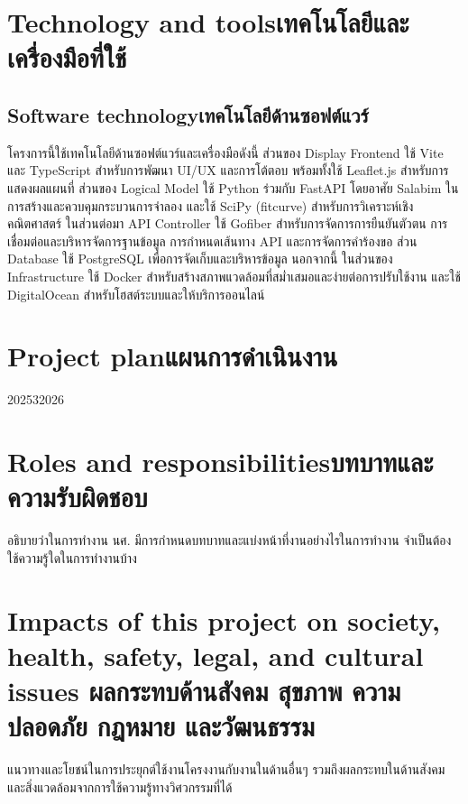 \section{\ifenglish Technology and tools\else เทคโนโลยีและเครื่องมือที่ใช้\fi}

\subsection{\ifenglish Software technology\else เทคโนโลยีด้านซอฟต์แวร์\fi}
    \begin{mypara}
        \indent โครงการนี้ใช้เทคโนโลยีด้านซอฟต์แวร์และเครื่องมือดังนี้ ส่วนของ Display Frontend ใช้ Vite และ TypeScript 
        สำหรับการพัฒนา UI/UX และการโต้ตอบ พร้อมทั้งใช้ Leaflet.js สำหรับการแสดงผลแผนที่ ส่วนของ Logical Model 
        ใช้ Python ร่วมกับ FastAPI โดยอาศัย Salabim ในการสร้างและควบคุมกระบวนการจำลอง และใช้ SciPy (fitcurve) 
        สำหรับการวิเคราะห์เชิงคณิตศาสตร์ ในส่วนต่อมา API Controller ใช้ Gofiber สำหรับการจัดการการยืนยันตัวตน 
        การเชื่อมต่อและบริหารจัดการฐานข้อมูล การกำหนดเส้นทาง API และการจัดการคำร้องขอ 
        ส่วน Database ใช้ PostgreSQL เพื่อการจัดเก็บและบริหารข้อมูล นอกจากนี้ ในส่วนของ 
        Infrastructure ใช้ Docker สำหรับสร้างสภาพแวดล้อมที่สม่ำเสมอและง่ายต่อการปรับใช้งาน และใช้ DigitalOcean 
        สำหรับโฮสต์ระบบและให้บริการออนไลน์
    \end{mypara}


\section{\ifenglish Project plan\else แผนการดำเนินงาน\fi}

\begin{plan}{6}{2025}{3}{2026}
\end{plan}

\section{\ifenglish Roles and responsibilities\else บทบาทและความรับผิดชอบ\fi}
อธิบายว่าในการทำงาน นศ. มีการกำหนดบทบาทและแบ่งหน้าที่งานอย่างไรในการทำงาน จำเป็นต้องใช้ความรู้ใดในการทำงานบ้าง

\section{\ifenglish%
Impacts of this project on society, health, safety, legal, and cultural issues
\else%
ผลกระทบด้านสังคม สุขภาพ ความปลอดภัย กฎหมาย และวัฒนธรรม
\fi}

แนวทางและโยชน์ในการประยุกต์ใช้งานโครงงานกับงานในด้านอื่นๆ รวมถึงผลกระทบในด้านสังคมและสิ่งแวดล้อมจากการใช้ความรู้ทางวิศวกรรมที่ได้
